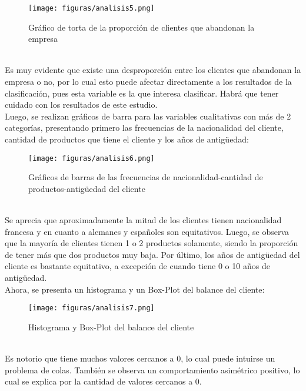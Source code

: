 \documentclass{report}
\begin{document}
\begin{figure}[htp]
        \centering
    	\texttt{[image: figuras/analisis5.png]}
    	\label{fig: Figura1}
    	\caption{Gráfico de torta de la proporción de clientes que abandonan la empresa}
        \end{figure}\\
Es muy evidente que existe una desproporción entre los clientes que abandonan la empresa o no, por lo cual esto puede afectar directamente a los resultados de la clasificación, pues esta variable es la que interesa clasificar. Habrá que tener cuidado con los resultados de este estudio.\\

Luego, se realizan gráficos de barra para las variables cualitativas con más de 2 categorías, presentando primero las frecuencias de la nacionalidad del cliente, cantidad de productos que tiene el cliente y los años de antigüedad:\\
\vspace{10cm}

\begin{figure}[htp]
        \centering
    	\texttt{[image: figuras/analisis6.png]}
    	\label{fig: Figura1}
    	\caption{Gráficos de barras de las frecuencias de nacionalidad-cantidad de productos-antigüedad del cliente}
        \end{figure}\\

Se aprecia que aproximadamente la mitad de los clientes tienen nacionalidad francesa y en cuanto a alemanes y españoles son equitativos. Luego, se observa que la mayoría de clientes tienen 1 o 2 productos solamente, siendo la proporción de tener más que dos productos muy baja. Por último, los años de antigüedad del cliente es bastante equitativo, a excepción de cuando tiene 0 o 10 años de antigüedad.\\

Ahora, se presenta un histograma y un Box-Plot del balance del cliente:\\

\begin{figure}[htp]
        \centering
    	\texttt{[image: figuras/analisis7.png]}
    	\label{fig: Figura1}
    	\caption{Histograma y Box-Plot del balance del cliente}
        \end{figure}\\

Es notorio que tiene muchos valores cercanos a 0, lo cual puede intuirse un problema de colas. También se observa un comportamiento asimétrico positivo, lo cual se explica por la cantidad de valores cercanos a 0.\\
\end{document}
